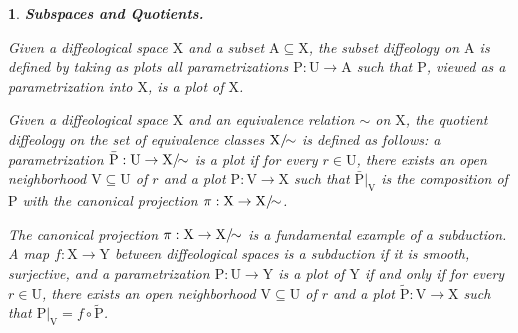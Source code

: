 \documentclass[10pt,reqno,letterpaper,twoside]{amsart}
\theoremstyle{article}
\newtheorem{article}{}
\def\artlabel[#1]{\textbf{#1.}}
\def \A{\mathrm A}
\def \P{\mathrm P}
\def \U{\mathrm U}
\def \V{\mathrm V}
\def \X{\mathrm X}
\def \Y{\mathrm Y}
\newcommand{\Xsim}{{\X/\hspace{-1ex}\sim}}
\begin{document}
  
  \begin{article}
    \artlabel[Subspaces and Quotients]
    \label{Subspaces_and_Quotients}
    
    Given a diffeological space $\X$ and a subset $\A \subseteq \X$,
    the \emph{subset diffeology} on $\A$ is defined by taking as plots all parametrizations $\P: \U \to \A$ such that $\P$,
    viewed as a parametrization into $\X$,
    is a plot of $\X$.
    
    Given a diffeological space $\X$ and an equivalence relation $\sim$ on $\X$,
    the \emph{quotient diffeology} on the set of equivalence classes $\Xsim$ is defined as follows:
    a parametrization $\bar{\P}: \U \to \Xsim$ is a plot if for every $r \in \U$,
    there exists an open neighborhood $\V \subseteq \U$ of $r$ and a plot $\P: \V \to \X$ such that $\bar{\P}|_\V$ is the composition of $\P$ with the canonical projection $\pi: \X \to \Xsim$.
    
    The canonical projection $\pi: \X \to \Xsim$ is a fundamental example of a \emph{subduction}.
    A map $f: \X \to \Y$ between diffeological spaces is a subduction if it is smooth, surjective,
    and a parametrization $\P: \U \to \Y$ is a plot of $\Y$ if and only if for every $r \in \U$, 	there exists an open neighborhood $\V \subseteq \U$ of $r$ and a plot $\tilde{\P}: \V \to \X$ such that $\P|_\V = f \circ \tilde{\P}$.
    
  \end{article}
  
  
\end{document}
